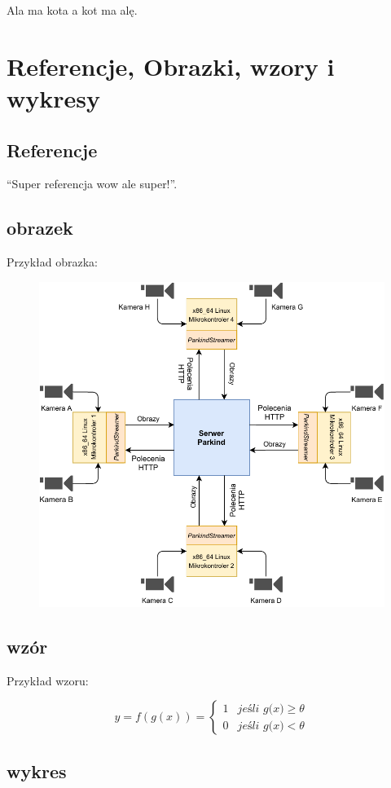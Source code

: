 Ala ma kota a kot ma alę.

\section{Referencje, Obrazki, wzory i wykresy}

\subsection{Referencje}

``Super referencja wow ale super!''\cite{rosenblatt1962principles}.

\subsection{obrazek}
Przykład obrazka:

\begin{figure}[H]
	\centering
	\includegraphics[width=0.5\columnwidth]{Graphics/Chapter 2/Parkind Network Topography.pdf}
	\label{fig:2ch1}
\end{figure}

\subsection{wzór}

Przykład wzoru:

\begin{equation}
	y = f(g(x)) =
		\begin{cases}
			1	&\textit{jeśli g(x)}\geq\theta \\ %
			0	&\textit{jeśli g(x)}<\theta %
		\end{cases}
\end{equation}

\subsection{wykres}

